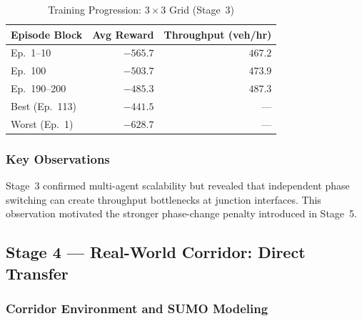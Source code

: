\documentclass[lettersize,journal]{IEEEtran}
\begin{document}
\begin{table}[!t]
\caption{Training Progression: $3\times3$ Grid (Stage~3)\label{tab:grid}}
\centering
\renewcommand{\arraystretch}{1.2}
\begin{tabular}{@{}lrr@{}}
\toprule
\textbf{Episode Block} & \textbf{Avg Reward} & \textbf{Throughput (veh/hr)} \\
\midrule
Ep.\ 1--10       & $-565.7$ & $467.2$ \\
Ep.\ 100         & $-503.7$ & $473.9$ \\
Ep.\ 190--200    & $-485.3$ & $487.3$ \\
\midrule
Best (Ep.\ 113)  & $-441.5$ & ---     \\
Worst (Ep.\ 1)   & $-628.7$ & ---     \\
\bottomrule
\end{tabular}
\end{table}

\subsubsection{Key Observations}

Stage~3 confirmed multi-agent scalability but revealed that independent
phase switching can create throughput bottlenecks at junction interfaces.
This observation motivated the stronger phase-change penalty introduced in
Stage~5.

\subsection{Stage 4 --- Real-World Corridor: Direct Transfer}
\label{sec:stage4}

\subsubsection{Corridor Environment and SUMO Modeling}
\end{document}
